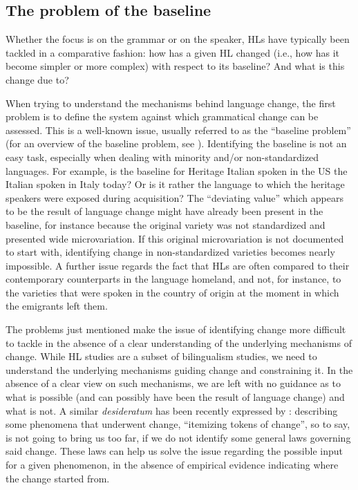 \documentclass[output=paper]{langscibook}
\begin{document}
\subsection{The problem of the baseline\label{sec:basel}}

Whether the focus is on the grammar or on the speaker, HLs have typically been tackled in a comparative fashion: how has a given HL changed (i.e., how has it become simpler or more complex) with respect to its baseline? And what is this change due to? 

When trying to understand the mechanisms behind language change, the first problem is to define the system against which grammatical change can be assessed. This is a well-known issue, usually referred to as the ``baseline problem'' (for an overview of the baseline problem, see \cites[1.1.2]{Polinsky2018}[Ch. 6]{AalberseMuysken2019}{Bayrametal2019}{DAlessandroEtAl2021}). Identifying the baseline is not an easy task, especially when dealing with minority and/or non-standardized languages. For example, is the baseline for Heritage Italian spoken in the US the Italian spoken in Italy today? Or is it rather the language to which the heritage speakers were exposed during acquisition? The ``deviating value'' which appears to be the result of language change might have already been present in the baseline, for instance because the original variety was not standardized and presented wide microvariation. If this original microvariation is not documented to start with, identifying change in non-standardized varieties becomes nearly impossible. A further issue regards the fact that HLs are often compared to their contemporary counterparts in the language homeland, and not, for instance, to the varieties that were spoken in the country of origin at the moment in which the emigrants left them.

The problems just mentioned make the issue of identifying change more difficult to tackle in the absence of a clear understanding of the underlying mechanisms of change. While HL studies are a subset of bilingualism studies, we need to understand the underlying mechanisms guiding change and constraining it. In the absence of a clear view on such mechanisms, we are left with no guidance as to what is possible (and can possibly have been the result of language change) and what is not. A similar \textit{desideratum} has been recently expressed by \citet{Polinsky22}: describing some phenomena that underwent change, ``itemizing tokens of change'', so to say, is not going to bring us too far, if we do not identify some general laws governing said change. These laws can help us solve the issue regarding the possible input for a given phenomenon, in the absence of empirical evidence indicating where the change started from.
\end{document}
